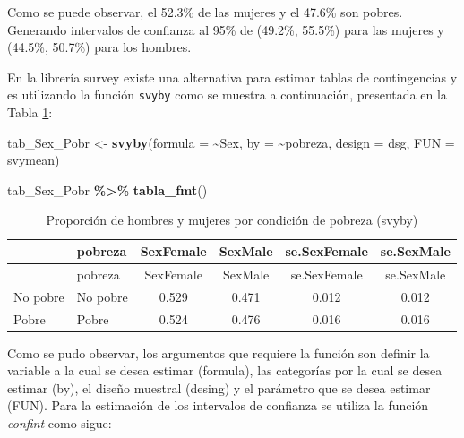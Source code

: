 \documentclass[
  spanish,
  12pt,
]{book}
\newenvironment{Shaded}{\begin{snugshade}}{\end{snugshade}}
\newcommand{\AttributeTok}[1]{\textcolor[rgb]{0.13,0.29,0.53}{#1}}
\newcommand{\FunctionTok}[1]{\textcolor[rgb]{0.13,0.29,0.53}{\textbf{#1}}}
\newcommand{\NormalTok}[1]{#1}
\newcommand{\OtherTok}[1]{\textcolor[rgb]{0.56,0.35,0.01}{#1}}
\newcommand{\SpecialCharTok}[1]{\textcolor[rgb]{0.81,0.36,0.00}{\textbf{#1}}}
\begin{document}
Como se puede observar, el 52.3\% de las mujeres y el 47.6\% son pobres. Generando intervalos de confianza al 95\% de (49.2\%, 55.5\%) para las mujeres y (44.5\%, 50.7\%) para los hombres.

En la librería survey existe una alternativa para estimar tablas de contingencias y es utilizando la función \texttt{svyby} como se muestra a continuación, presentada en la Tabla \ref{tab:tab-svyby-pobreza-sexo}:

\begin{Shaded}
\begin{Highlighting}[]
\NormalTok{tab\_Sex\_Pobr }\OtherTok{\textless{}{-}} \FunctionTok{svyby}\NormalTok{(}\AttributeTok{formula =} \SpecialCharTok{\textasciitilde{}}\NormalTok{Sex, }\AttributeTok{by =}  \SpecialCharTok{\textasciitilde{}}\NormalTok{pobreza, }\AttributeTok{design =}\NormalTok{ dsg, }\AttributeTok{FUN =}\NormalTok{ svymean) }
\end{Highlighting}
\end{Shaded}

\begin{Shaded}
\begin{Highlighting}[]
\NormalTok{tab\_Sex\_Pobr }\SpecialCharTok{\%\textgreater{}\%}
  \FunctionTok{tabla\_fmt}\NormalTok{()}
\end{Highlighting}
\end{Shaded}

\begin{longtable}[]{@{}llcccc@{}}
\caption{\label{tab:tab-svyby-pobreza-sexo}Proporción de hombres y mujeres por condición de pobreza (svyby)}\tabularnewline
\toprule\noalign{}
& pobreza & SexFemale & SexMale & se.SexFemale & se.SexMale \\
\midrule\noalign{}
\endfirsthead
\toprule\noalign{}
& pobreza & SexFemale & SexMale & se.SexFemale & se.SexMale \\
\midrule\noalign{}
\endhead
\bottomrule\noalign{}
\endlastfoot
No pobre & No pobre & 0.529 & 0.471 & 0.012 & 0.012 \\
Pobre & Pobre & 0.524 & 0.476 & 0.016 & 0.016 \\
\end{longtable}

Como se pudo observar, los argumentos que requiere la función son definir la variable a la cual se desea estimar (formula), las categorías por la cual se desea estimar (by), el diseño muestral (desing) y el parámetro que se desea estimar (FUN). Para la estimación de los intervalos de confianza se utiliza la función \emph{confint} como sigue:
\end{document}

